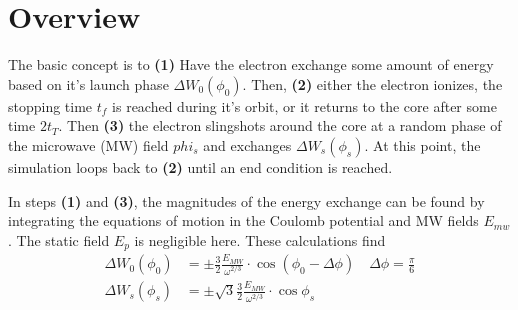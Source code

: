\documentclass[aps,pra,preprint,groupedaddress]{revtex4-1}
\begin{document}
\section{\label{sec:over}Overview}

The basic concept is to \textbf{(1)} Have the electron exchange some amount of energy based on it's launch phase $\Delta W_0 (\phi_0)$. Then, \textbf{(2)} either the electron ionizes, the stopping time $t_f$ is reached during it's orbit, or it returns to the core after some time $2 t_T$. Then \textbf{(3)} the electron slingshots around the core at a random phase of the microwave (MW) field $phi_s$ and exchanges $\Delta W_s (\phi_s)$. At this point, the simulation loops back to \textbf{(2)} until an end condition is reached.

In steps \textbf{(1)} and \textbf{(3)}, the magnitudes of the energy exchange can be found by integrating the equations of motion in the Coulomb potential and MW fields $E_{mw}$. The static field $E_p$ is negligible here. These calculations find
\begin{align}
\Delta W_0(\phi_0) & = \pm \frac{3}{2} \frac{E_{MW}}{\omega^{2/3}} \cdot \cos{(\phi_0 - \Delta \phi)} \quad \Delta \phi = \frac{\pi}{6} \\
\Delta W_s(\phi_s) & = \pm \sqrt{3} \frac{3}{2} \frac{E_{MW}}{\omega^{2/3}} \cdot \cos{\phi_s}
\end{align}
\end{document}
